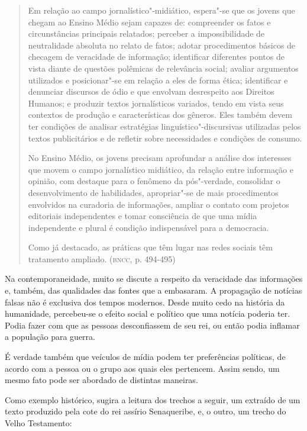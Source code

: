 \documentclass[12pt]{extarticle}
\begin{document}
\begin{quote}
Em relação ao campo jornalístico"-midiático, espera"-se que os jovens
que chegam ao Ensino Médio sejam capazes de: compreender os fatos e
circunstâncias principais relatados; perceber a impossibilidade de
neutralidade absoluta no relato de fatos; adotar procedimentos básicos
de checagem de veracidade de informação; identificar diferentes pontos
de vista diante de questões polêmicas de relevância social; avaliar
argumentos utilizados e posicionar"-se em relação a eles de forma ética;
identificar e denunciar discursos de ódio e que envolvam desrespeito aos
Direitos Humanos; e produzir textos jornalísticos variados, tendo em
vista seus contextos de produção e características dos gêneros. Eles
também devem ter condições de analisar estratégias
linguístico"-discursivas utilizadas pelos textos publicitários e de
refletir sobre necessidades e condições de consumo.

No Ensino Médio, os jovens precisam aprofundar a análise dos interesses
que movem o campo jornalístico midiático, da relação entre informação e
opinião, com destaque para o fenômeno da pós"-verdade, consolidar o
desenvolvimento de habilidades, apropriar"-se de mais procedimentos
envolvidos na curadoria de informações, ampliar o contato com projetos
editoriais independentes e tomar consciência de que uma mídia
independente e plural é condição indispensável para a democracia.

Como já destacado, as práticas que têm lugar nas redes sociais têm
tratamento ampliado. (\textsc{bncc}, p. 494-495)
\end{quote}

Na contemporaneidade, muito se discute a respeito da veracidade das
informações e, também, das qualidades das fontes que a embasaram. A
propagação de notícias falsas não é exclusiva dos tempos modernos.
Desde muito cedo na história da humanidade, percebeu-se o efeito
social e político que uma notícia poderia ter. Podia fazer com que as
pessoas desconfiassem de seu rei, ou então podia inflamar a população
para guerra.

É verdade também que veículos de mídia podem ter preferências políticas,
de acordo com a pessoa ou o grupo aos quais eles pertencem. Assim sendo,
um mesmo fato pode ser abordado de distintas maneiras.

Como exemplo histórico, sugira a leitura dos trechos a seguir, um
extraído de um texto produzido pela cote do rei assírio Senaqueribe, e,
o outro, um trecho do Velho Testamento:
\end{document}
